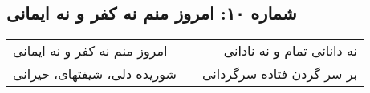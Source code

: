 \begin{center}
\section*{شماره ۱۰: امروز منم نه کفر و نه ایمانی}
\label{sec:010}
\begin{longtable}{l p{0.5cm} r}
امروز منم نه کفر و نه ایمانی
&&
نه دانائی تمام و نه نادانی
\\
شوریده دلی، شیفتهای، حیرانی
&&
بر سر گردن فتاده سرگردانی
\\
\end{longtable}
\end{center}

